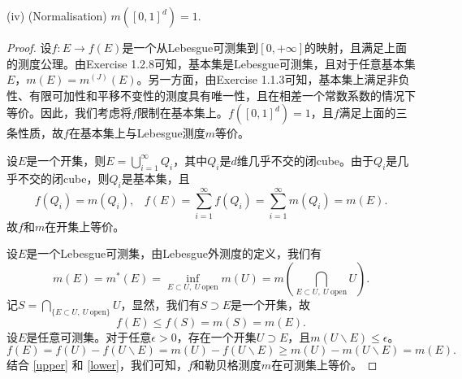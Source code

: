 \documentclass[reqno,a4paper,14pt]{amsart}
\begin{document}
(iv) (Normalisation) $m([0,1]^d)=1$.
\begin{proof}
    设$f:E\to f(E)$是一个从Lebesgue可测集到$[0,+\infty]$的映射，且满足上面的测度公理。由Exercise 1.2.8可知，基本集是Lebesgue可测集，且对于任意基本集$E$，$m(E)=m^{(J)}(E)$。另一方面，由Exercise 1.1.3可知，基本集上满足非负性、有限可加性和平移不变性的测度具有唯一性，且在相差一个常数系数的情况下等价。因此，我们考虑将$f$限制在基本集上。$f([0,1]^d)=1$，且$f$满足上面的三条性质，故$f$在基本集上与Lebesgue测度$m$等价。

    设$E$是一个开集，则$E=\bigcup_{i=1}^\infty Q_i$，其中$Q_i$是$d$维几乎不交的闭cube。由于$Q_i$是几乎不交的闭cube，则$Q_i$是基本集，且
    \begin{equation*}
        f(Q_i)=m(Q_i),\;\;\; f(E)=\sum_{i=1}^\infty f(Q_i)=\sum_{i=1}^\infty m(Q_i)=m(E).
    \end{equation*}
    故$f$和$m$在开集上等价。

    设$E$是一个Lebesgue可测集，由Lebesgue外测度的定义，我们有
    \begin{equation*}
        m(E)=m^*(E)=\inf_{E\subset U,\ U\ \mathrm{open}} m(U)=m(\bigcap_{E\subset U,\ U\ \mathrm{open}}U).
    \end{equation*}
    记$S=\bigcap_{\{E\subset U,\ U\ \mathrm{open}\}}U$，显然，我们有$S\supset E$是一个开集，故
    \begin{equation}
        f(E)\leq f(S)=m(S)=m(E).
        \label{upper}
    \end{equation}
    设$E$是任意可测集。对于任意$\epsilon>0$，存在一个开集$U\supset E$，且$m(U\backslash E)\leq \epsilon$。
    \begin{equation}
        f(E)=f(U)-f(U\backslash E)=m(U)-f(U\backslash E)\geq m(U)-m(U\backslash E)=m(E).
        \label{lower}
    \end{equation}
    结合 \eqref{upper} 和 \eqref{lower}，我们可知，$f$和勒贝格测度$m$在可测集上等价。
\end{proof}
\end{document}
